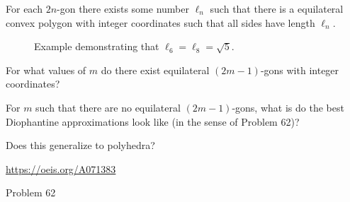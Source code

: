 \documentclass{article}
\begin{document}
For each $2n$-gon there exists some number $\ell_n$ such that there is a
equilateral convex polygon with integer coordinates such that all sides have
length $\ell_n$.
\begin{figure}[ht!]
  \centering
  \hspace{1cm}
  \caption{
    Example demonstrating that $\ell_6 = \ell_8 = \sqrt{5}$.
  }
\end{figure}
\begin{question}
  For what values of $m$ do there exist equilateral $(2m-1)$-gons with integer
  coordinates?
\end{question}

\begin{related}
  \item For $m$ such that there are no equilateral $(2m-1)$-gons, what is do
    the best Diophantine approximations look like (in the sense of
    Problem 62)?
  \item Does this generalize to polyhedra?
\end{related}
\begin{references}
  \item \url{https://oeis.org/A071383}
  \item Problem 62
\end{references}
\end{document}

